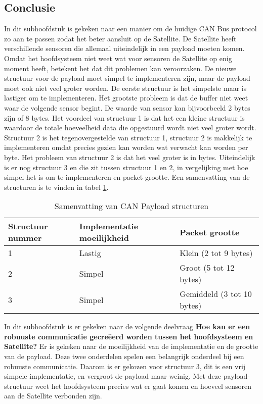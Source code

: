 \subsection{Conclusie}
In dit subhoofdstuk is gekeken naar een manier om de huidige CAN Bus protocol zo aan te passen zodat het beter aansluit op de Satellite. De Satellite heeft verschillende sensoren die allemaal uiteindelijk in een payload moeten komen. Omdat het hoofdsysteem niet weet wat voor sensoren de Satellite op enig moment heeft, betekent het dat dit problemen kan veroorzaken. De nieuwe structuur voor de payload moet simpel te implementeren zijn, maar de payload moet ook niet veel groter worden. De eerste structuur is het simpelste maar is lastiger om te implementeren. Het grootste probleem is dat de buffer niet weet waar de volgende sensor begint. De waarde van sensor kan bijvoorbeeld 2 bytes zijn of 8 bytes. Het voordeel van structuur 1 is dat het een kleine structuur is waardoor de totale hoeveelheid data die opgestuurd wordt niet veel groter wordt. Structuur 2 is het tegenovergestelde van structuur 1, structuur 2 is makkelijk te implementeren omdat precies gezien kan worden wat verwacht kan worden per byte. Het probleem van structuur 2 is dat het veel groter is in bytes. Uiteindelijk is er nog structuur 3 en die zit tussen structuur 1 en 2, in vergelijking met hoe simpel het is om te implementeren en packet grootte. Een samenvatting van de structuren is te vinden in tabel \ref{tab:samenvattingstructuur}. \newline

\begin{table}[h!]
	\centering
	\caption{Samenvatting van CAN Payload structuren}
	\label{tab:samenvattingstructuur}
	\begin{tabular}{lll}
	\toprule
		Structuur nummer & Implementatie moeilijkheid & Packet grootte             \\ \midrule
		1                & Lastig                     & Klein (2 tot 9 bytes)      \\
		2                & Simpel                     & Groot (5 tot 12 bytes)     \\
		3                & Simpel                     & Gemiddeld (3 tot 10 bytes) \\ \bottomrule
	\end{tabular}%
\end{table}

\noindent In dit subhoofdstuk is er gekeken naar de volgende deelvraag \textbf{Hoe kan er een robuuste communicatie gecreëerd worden tussen het hoofdsysteem en Satellite?} Er is gekeken naar de moeilijkheid van de implementatie en de grootte van de payload. Deze twee onderdelen spelen een belangrijk onderdeel bij een robuuste communicatie. Daarom is er gekozen voor structuur 3, dit is een vrij simpele implementatie, en vergroot de payload maar weinig. Met deze payload-structuur weet het hoofdsysteem precies wat er gaat komen en hoeveel sensoren aan de Satellite verbonden zijn.